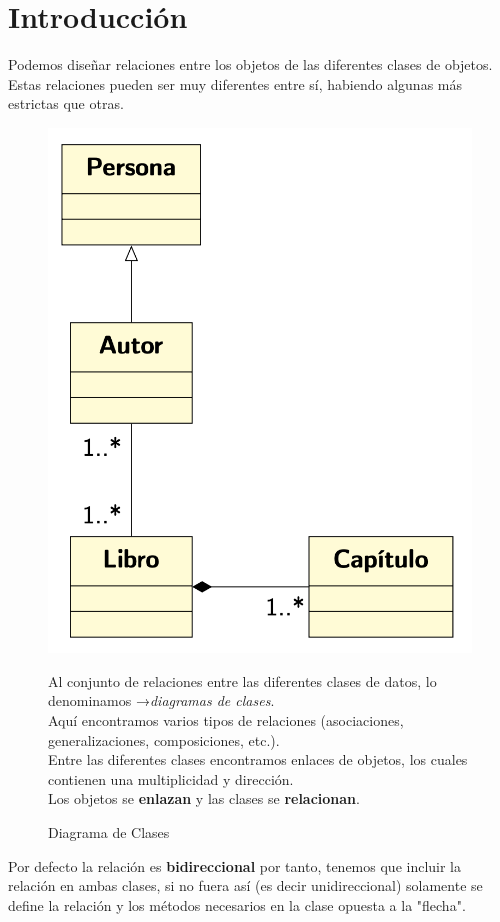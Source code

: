 \thispagestyle{empty}
\cleardoublepage
\chapter{Introducción}
Podemos diseñar relaciones entre los objetos de las diferentes clases de objetos.
Estas relaciones pueden ser muy diferentes entre sí, habiendo algunas más estrictas
que otras.
\vspace*{0.2cm}
\begin{figure}[h]
  \begin{minipage}{0.4\textwidth}
    \includegraphics[width=\textwidth]{Imagenes/intro1.png}
    \caption{Diagrama de Clases}
  \end{minipage}
  \begin{minipage}{0.6\textwidth}
      \vspace{-6\baselineskip} %
    Al conjunto de relaciones entre las diferentes clases de datos, lo denominamos →\textit{diagramas de clases}.\\
    
	Aquí encontramos varios tipos de relaciones (asociaciones, generalizaciones, composiciones, etc.).\\
	
	Entre las diferentes clases encontramos enlaces de objetos, los cuales contienen una multiplicidad y dirección.\\
	
	Los objetos se \textbf{enlazan} y las clases se \textbf{relacionan}.
  \end{minipage}
  
\end{figure}
Por defecto la relación es \textbf{bidireccional} por tanto, tenemos que incluir la relación en ambas clases, si no fuera así (es decir unidireccional) solamente se define la relación y los métodos necesarios en la clase opuesta a la "flecha".